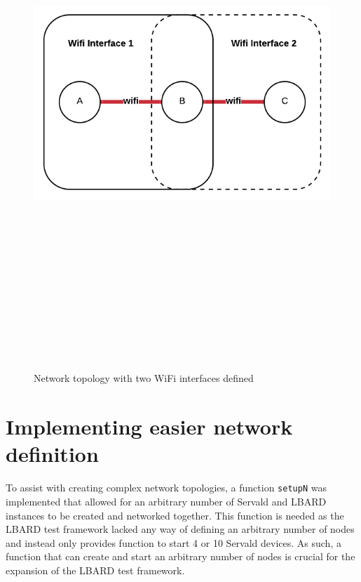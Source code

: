 \begin{figure}
    \begin{centering}
        \includegraphics[width=14cm,height=20cm,keepaspectratio]{Figures/networkWifiInterface2.png}
        \caption{Network topology with two WiFi interfaces defined}
        \label{fig:networkWifi2}
    \end{centering}
\end{figure}


\section{Implementing easier network definition}
To assist with creating complex network topologies, a function \verb|setupN| was implemented that allowed for an arbitrary number of Servald and LBARD instances to be created and networked together.
This function is needed as the LBARD test framework lacked any way of defining an arbitrary number of nodes and instead only provides function to start 4 or 10 Servald devices.
As such, a function that can create and start an arbitrary number of nodes is crucial for the expansion of the LBARD test framework.

